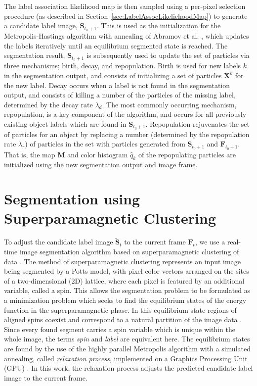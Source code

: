 The label association likelihood map is then sampled using a per-pixel selection procedure (as described in Section~\ref{sec:LabelAssocLikeliehoodMap}) to generate a candidate label image, $\tilde{\mathbf{S}}_{t_0+1}$. This is used as the initialization for the Metropolis-Hastings algorithm with annealing of Abramov et al. \cite{Abramov_RealtimeSegmentation}, which updates the labels iteratively until an equilibrium segmented state is reached. The segmentation result, $\mathbf{S}_{t_0+1}$  is subsequently used to update the set of particles via three mechanisms; birth, decay, and repopulation. Birth is used for new labels $k$ in the segmentation output, and consists of initializing a set of particles $\mathbf{X}^k$ for the new label. Decay occurs when a label is not found in the segmentation output, and consists of killing a number of the particles of the missing label, determined by the decay rate $\lambda_d$. The most commonly occurring mechanism, repopulation, is a key component of the algorithm, and 
occurs for all previously existing object labels which are found in $\mathbf{S}_{t_0+1}$. Repopulation rejuvenates the set of particles for an object by replacing a number (determined by the repopulation rate $\lambda_r$) of particles in the set with particles generated from $\mathbf{S}_{t_0+1}$ and $\mathbf{F}_{t_0+1}$. That is, the map $\mathbf{M}$ and color histogram $\hat{q}_{k}$ of the repopulating particles are initialized using the new segmentation output and image frame. 

\section{Segmentation using Superparamagnetic Clustering}
To adjust the candidate label image $\tilde{\mathbf{S}}_{t}$ to the current frame $\mathbf{F}_{t}$, we use a real-time image segmentation algorithm based on superparamagnetic clustering of data \cite{Blatt_SuperClustering}. The method of superparamagnetic clustering represents an input image being segmented by a Potts model, with pixel color vectors arranged on the sites of a two-dimensional (2D) lattice, where each pixel is featured by an additional variable, called a spin. This allows the segmentation problem to be formulated as a minimization problem which seeks to find the equilibrium states of the energy function in the superparamagnetic phase. In this equilibrium state regions of aligned spins coexist and correspond to a natural partition of the image data \cite{Blatt_SuperClustering}. Since every found segment carries a spin variable which is unique within the whole image, the terms {\em spin} and {\em label} are equivalent here. The equilibrium states are found by the use of the highly parallel 
Metropolis algorithm with a simulated annealing, called {\em relaxation process}, implemented on a Graphics Processing Unit (GPU) \cite{Abramov_RealtimeSegmentation}. In this work, the relaxation process adjusts the predicted candidate label image to the current frame. 

